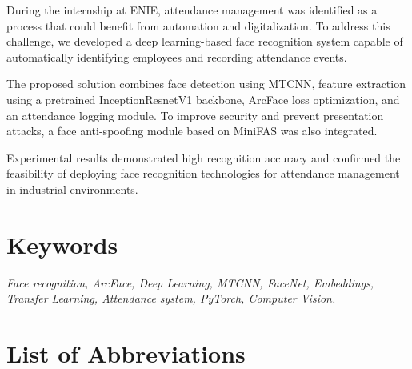 \documentclass[sommairechap,stylejchiquet]{these_gi}
\begin{document}
During the internship at ENIE, attendance management was identified as a process that could benefit from automation and digitalization. To address this challenge, we developed a deep learning-based face recognition system capable of automatically identifying employees and recording attendance events.

The proposed solution combines face detection using MTCNN, feature extraction using a pretrained InceptionResnetV1 backbone, ArcFace loss optimization, and an attendance logging module. To improve security and prevent presentation attacks, a face anti-spoofing module based on MiniFAS was also integrated.

Experimental results demonstrated high recognition accuracy and confirmed the feasibility of deploying face recognition technologies for attendance management in industrial environments.

\newpage

\section*{Keywords}
\textit{Face recognition, ArcFace, Deep Learning, MTCNN, FaceNet, Embeddings, Transfer Learning, Attendance system, PyTorch, Computer Vision.}

\newpage

\section*{List of Abbreviations}
\end{document}
